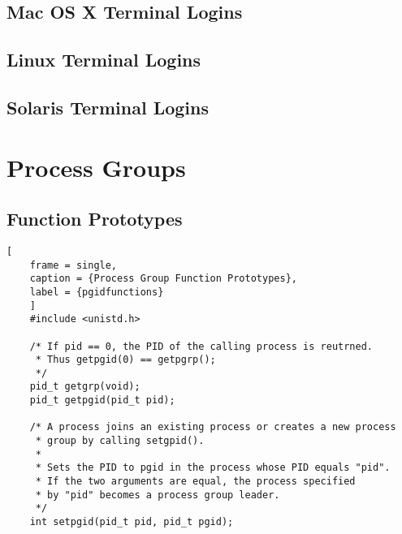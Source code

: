 \documentclass{article}
\begin{document}
\subsection{Mac OS X Terminal Logins}

\subsection{Linux Terminal Logins}

\subsection{Solaris Terminal Logins}

\section{Process Groups}
\subsection{Function Prototypes}

\begin{lstlisting}[
    frame = single,
    caption = {Process Group Function Prototypes},
    label = {pgidfunctions}
    ]
    #include <unistd.h>

    /* If pid == 0, the PID of the calling process is reutrned.
     * Thus getpgid(0) == getpgrp();
     */
    pid_t getgrp(void);
    pid_t getpgid(pid_t pid);

    /* A process joins an existing process or creates a new process 
     * group by calling setgpid().
     * 
     * Sets the PID to pgid in the process whose PID equals "pid".
     * If the two arguments are equal, the process specified 
     * by "pid" becomes a process group leader.
     */
    int setpgid(pid_t pid, pid_t pgid);
\end{lstlisting}
\end{document}
